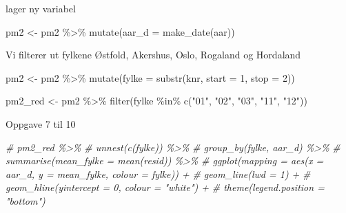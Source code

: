 \documentclass[
]{article}
\newenvironment{Shaded}{\begin{snugshade}}{\end{snugshade}}
\newcommand{\AttributeTok}[1]{\textcolor[rgb]{0.77,0.63,0.00}{#1}}
\newcommand{\CommentTok}[1]{\textcolor[rgb]{0.56,0.35,0.01}{\textit{#1}}}
\newcommand{\DecValTok}[1]{\textcolor[rgb]{0.00,0.00,0.81}{#1}}
\newcommand{\FunctionTok}[1]{\textcolor[rgb]{0.00,0.00,0.00}{#1}}
\newcommand{\NormalTok}[1]{#1}
\newcommand{\OtherTok}[1]{\textcolor[rgb]{0.56,0.35,0.01}{#1}}
\newcommand{\SpecialCharTok}[1]{\textcolor[rgb]{0.00,0.00,0.00}{#1}}
\newcommand{\StringTok}[1]{\textcolor[rgb]{0.31,0.60,0.02}{#1}}
\begin{document}
lager ny variabel

\begin{Shaded}
\begin{Highlighting}[]
\NormalTok{pm2 }\OtherTok{\textless{}{-}}\NormalTok{ pm2 }\SpecialCharTok{\%\textgreater{}\%}
\FunctionTok{mutate}\NormalTok{(}\AttributeTok{aar\_d =} \FunctionTok{make\_date}\NormalTok{(aar))}
\end{Highlighting}
\end{Shaded}

Vi filterer ut fylkene Østfold, Akershus, Oslo, Rogaland og Hordaland

\begin{Shaded}
\begin{Highlighting}[]
\NormalTok{pm2 }\OtherTok{\textless{}{-}}\NormalTok{ pm2 }\SpecialCharTok{\%\textgreater{}\%}
\FunctionTok{mutate}\NormalTok{(}\AttributeTok{fylke =} \FunctionTok{substr}\NormalTok{(knr, }\AttributeTok{start =} \DecValTok{1}\NormalTok{, }\AttributeTok{stop =} \DecValTok{2}\NormalTok{))}
\end{Highlighting}
\end{Shaded}

\begin{Shaded}
\begin{Highlighting}[]
\NormalTok{pm2\_red }\OtherTok{\textless{}{-}}\NormalTok{ pm2 }\SpecialCharTok{\%\textgreater{}\%} 
  \FunctionTok{filter}\NormalTok{(fylke }\SpecialCharTok{\%in\%} \FunctionTok{c}\NormalTok{(}\StringTok{"01"}\NormalTok{, }\StringTok{"02"}\NormalTok{, }\StringTok{"03"}\NormalTok{, }\StringTok{"11"}\NormalTok{, }\StringTok{"12"}\NormalTok{))}
\end{Highlighting}
\end{Shaded}

Oppgave 7 til 10

\begin{Shaded}
\begin{Highlighting}[]
\CommentTok{\# pm2\_red \%\textgreater{}\% }
\CommentTok{\#   unnest(c(fylke)) \%\textgreater{}\% }
\CommentTok{\#   group\_by(fylke, aar\_d) \%\textgreater{}\% }
\CommentTok{\#   summarise(mean\_fylke = mean(resid)) \%\textgreater{}\% }
\CommentTok{\#   ggplot(mapping = aes(x = aar\_d, y = mean\_fylke, colour = fylke)) +}
\CommentTok{\#   geom\_line(lwd = 1) +}
\CommentTok{\#   geom\_hline(yintercept = 0, colour = "white") +}
\CommentTok{\#   theme(legend.position = "bottom")}
\end{Highlighting}
\end{Shaded}
\end{document}

